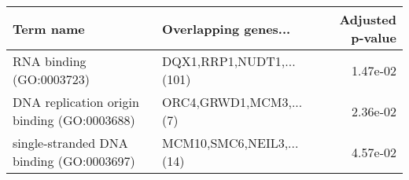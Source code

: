 \begin{tabular}{llr}
\toprule
                                  Term name &     Overlapping genes... &  Adjusted p-value \\
\midrule
                   RNA binding (GO:0003723) & DQX1,RRP1,NUDT1,...(101) &          1.47e-02 \\
DNA replication origin binding (GO:0003688) &   ORC4,GRWD1,MCM3,...(7) &          2.36e-02 \\
   single-stranded DNA binding (GO:0003697) & MCM10,SMC6,NEIL3,...(14) &          4.57e-02 \\
\bottomrule
\end{tabular}
